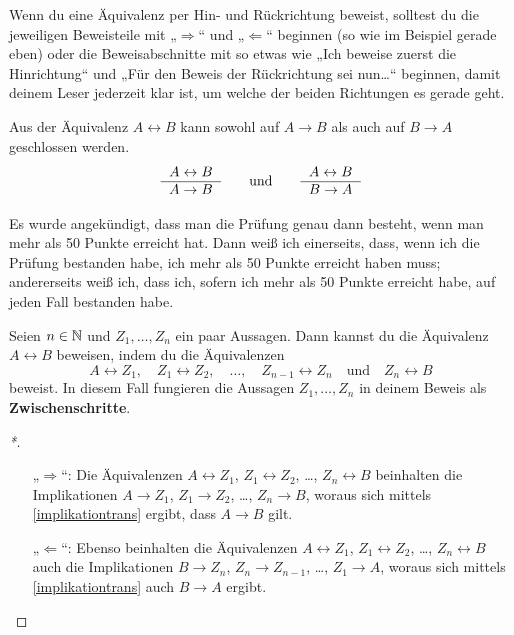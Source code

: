 \begin{bem}
    Wenn du eine Äquivalenz per Hin- und Rückrichtung beweist, solltest du die jeweiligen Beweisteile mit „$\Rightarrow$“ und „$\Leftarrow$“ beginnen (so wie im Beispiel gerade eben) oder die Beweisabschnitte mit so etwas wie „Ich beweise zuerst die Hinrichtung“ und „Für den Beweis der Rückrichtung sei nun\dots“ beginnen, damit deinem Leser jederzeit klar ist, um welche der beiden Richtungen es gerade geht.
\end{bem}


\begin{axiom}
    Aus der Äquivalenz $A\leftrightarrow B$ kann sowohl auf $A\to B$ als auch auf $B\to A$ geschlossen werden.
    \[\begin{tabular}{r}
        $A\leftrightarrow B$ \\
        \hline 
        $A\to B$ 
    \end{tabular} \qquad\text{und}\qquad \begin{tabular}{r}
        $A\leftrightarrow B$ \\
        \hline 
        $B\to A$ 
    \end{tabular}\]
\end{axiom}


\begin{bsp}
    Es wurde angekündigt, dass man die Prüfung genau dann besteht, wenn man mehr als 50 Punkte erreicht hat. Dann weiß ich einerseits, dass, wenn ich die Prüfung bestanden habe, ich mehr als 50 Punkte erreicht haben muss; andererseits weiß ich, dass ich, sofern ich mehr als 50 Punkte erreicht habe, auf jeden Fall bestanden habe.
\end{bsp}


\begin{satz} \label{ifftrans}
    Seien $n\in\mathbb N$ und $Z_1,\dots , Z_n$ ein paar Aussagen. Dann kannst du die Äquivalenz $A\leftrightarrow B$ beweisen, indem du die Äquivalenzen
        \[ A\leftrightarrow Z_1,\quad Z_1\leftrightarrow Z_2,\quad \dots,\quad Z_{n-1}\leftrightarrow Z_n \quad\text{und}\quad Z_n\leftrightarrow B \]
    beweist. In diesem Fall fungieren die Aussagen $Z_1,\dots , Z_n$ in deinem Beweis als \textbf{Zwischenschritte}.
\end{satz}
\begin{proof}[*]
    \begin{enumerate}
        \item[„$\Rightarrow$“:] Die Äquivalenzen $A\leftrightarrow Z_1$, $Z_1\leftrightarrow Z_2$, \dots, $Z_n\leftrightarrow B$ beinhalten die Implikationen $A\to Z_1$, $Z_1\to Z_2$, \dots, $Z_n\to B$, woraus sich mittels \cref{implikationtrans} ergibt, dass $A\to B$ gilt.
        \item[„$\Leftarrow$“:] Ebenso beinhalten die Äquivalenzen $A\leftrightarrow Z_1$, $Z_1\leftrightarrow Z_2$, \dots, $Z_n\leftrightarrow B$ auch die Implikationen $B\to Z_n$, $Z_n\to Z_{n-1}$, \dots, $Z_1\to A$, woraus sich mittels \cref{implikationtrans} auch $B\to A$ ergibt. \qedhere
    \end{enumerate}
\end{proof}


